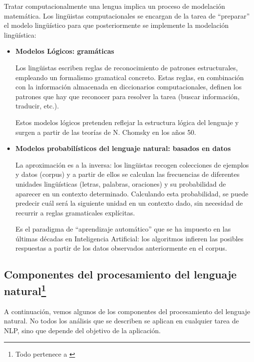 \documentclass[runningheads]{llncs}
\begin{document}
Tratar computacionalmente una lengua implica un proceso de modelación matemática. Los lingüistas computacionales se encargan de la tarea de “preparar” el modelo lingüístico para que posteriormente se implemente la modelación lingüística:
\begin{itemize}


\item{\textbf{Modelos Lógicos: gramáticas}

Los lingüistas escriben reglas de reconocimiento de patrones estructurales, empleando un formalismo gramatical concreto. Estas reglas, en combinación con la información almacenada en diccionarios computacionales, definen los patrones que hay que reconocer para resolver la tarea (buscar información, traducir, etc.).

Estos modelos lógicos pretenden reflejar la estructura lógica del lenguaje y surgen a partir de las teorías de N. Chomsky en los años 50.} 


\item{\textbf{Modelos probabilísticos del lenguaje natural: basados en datos}

La aproximación es a la inversa: los lingüistas recogen colecciones de ejemplos y datos (corpus) y a partir de ellos se calculan las frecuencias de diferentes unidades lingüísticas (letras, palabras, oraciones) y su probabilidad de aparecer en un contexto determinado. Calculando esta probabilidad, se puede predecir cuál será la siguiente unidad en un contexto dado, sin necesidad de recurrir a reglas gramaticales explícitas.

Es el paradigma de “aprendizaje automático” que se ha impuesto en las últimas décadas en Inteligencia Artificial: los algoritmos infieren las posibles respuestas a partir de los datos observados anteriormente en el corpus.}
\end{itemize}

\subsection{Componentes del procesamiento del lenguaje natural\protect\footnote{Todo pertenece a \cite{nlp}}}

A continuación, vemos algunos de los componentes del procesamiento del lenguaje natural. No todos los análisis que se describen se aplican en cualquier tarea de NLP, sino que depende del objetivo de la aplicación.
\end{document}
